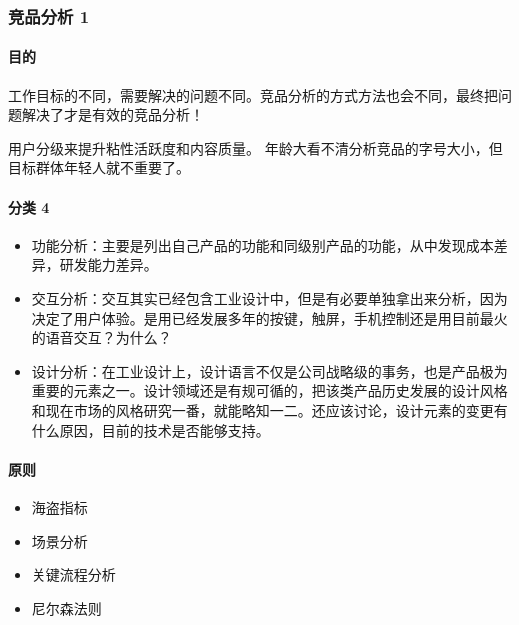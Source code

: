 \documentclass[letterpaper,11pt,english]{sphinxmanual}
\begin{document}
\subsubsection{竞品分析 1\sphinxfootnotemark[174]}
\label{\detokenize{chapter_skill/goods_analysis:id1}}\label{\detokenize{chapter_skill/goods_analysis::doc}}%
\begin{footnotetext}[174]\sphinxAtStartFootnote
{}
%
\end{footnotetext}\ignorespaces 

\paragraph{目的}
\label{\detokenize{chapter_skill/goods_analysis:id2}}
工作目标的不同，需要解决的问题不同。竞品分析的方式方法也会不同，最终把问题解决了才是有效的竞品分析！

用户分级来提升粘性活跃度和内容质量。
年龄大看不清分析竞品的字号大小，但目标群体年轻人就不重要了。


\paragraph{分类 4\sphinxfootnotemark[175]}
\label{\detokenize{chapter_skill/goods_analysis:id3}}%
\begin{footnotetext}[175]\sphinxAtStartFootnote
{}
%
\end{footnotetext}\ignorespaces \begin{itemize}
\item {} 
功能分析：主要是列出自己产品的功能和同级别产品的功能，从中发现成本差异，研发能力差异。

\item {} 
交互分析：交互其实已经包含工业设计中，但是有必要单独拿出来分析，因为决定了用户体验。是用已经发展多年的按键，触屏，手机控制还是用目前最火的语音交互？为什么？

\item {} 
设计分析：在工业设计上，设计语言不仅是公司战略级的事务，也是产品极为重要的元素之一。设计领域还是有规可循的，把该类产品历史发展的设计风格和现在市场的风格研究一番，就能略知一二。还应该讨论，设计元素的变更有什么原因，目前的技术是否能够支持。

\end{itemize}


\paragraph{原则}
\label{\detokenize{chapter_skill/goods_analysis:id4}}\begin{itemize}
\item {} 
海盗指标

\item {} 
场景分析

\item {} 
关键流程分析

\item {} 
尼尔森法则

\end{itemize}
\end{document}
